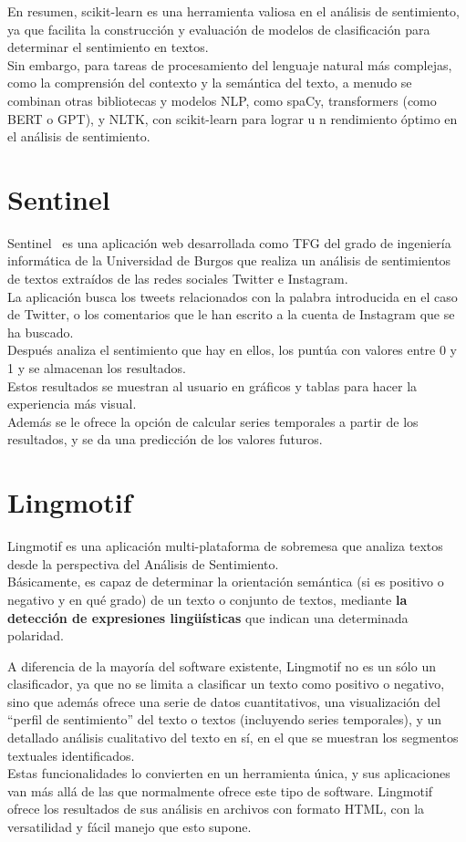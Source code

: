En resumen, scikit-learn es una herramienta valiosa en el análisis de sentimiento, 
ya que facilita la construcción y evaluación de modelos de clasificación 
para determinar el sentimiento en textos.\\ 
Sin embargo, para tareas de procesamiento del lenguaje natural 
más complejas, como la comprensión del contexto y la semántica del texto, 
a menudo se combinan otras bibliotecas y modelos NLP, como spaCy, 
transformers (como BERT o GPT), y NLTK, con scikit-learn para lograr u
n rendimiento óptimo en el análisis de sentimiento.


\section{Sentinel}
Sentinel~\cite{Sentinel1} es una aplicación web desarrollada como TFG del grado de ingeniería 
informática de la Universidad de Burgos que realiza un análisis de sentimientos de textos 
extraídos de las redes sociales Twitter e Instagram.\\
La aplicación busca los tweets relacionados con la palabra introducida 
en el caso de Twitter, o los comentarios que le han escrito a la 
cuenta de Instagram que se ha buscado.\\
Después analiza el sentimiento que hay en ellos, los puntúa con valores entre 0 y 1 y 
se almacenan los resultados.\\
Estos resultados se muestran al usuario en gráficos 
y tablas para hacer la experiencia más visual.\\ 
Además se le ofrece la opción de calcular series temporales a partir de los resultados, 
y se da una predicción de los valores futuros.


\section{Lingmotif~\cite{lingmotif}}
Lingmotif es una aplicación multi-plataforma de sobremesa que analiza textos desde la perspectiva 
del Análisis de Sentimiento. \\Básicamente, es capaz de determinar la orientación semántica 
(si es positivo o negativo y en qué grado) de un texto o conjunto de textos, mediante \textbf{la detección 
de expresiones lingüísticas} que indican una determinada polaridad.

A diferencia de la mayoría del software existente, Lingmotif no es un sólo un clasificador, 
ya que no se limita a clasificar un texto como positivo o negativo, sino que además ofrece una
 serie de datos cuantitativos, una visualización del ``perfil de sentimiento'' del texto o textos 
 (incluyendo series temporales), y un detallado análisis cualitativo del texto en sí, en el que 
 se muestran los segmentos textuales identificados. \\Estas funcionalidades lo convierten en un herramienta 
 única, y sus aplicaciones van más allá de las que normalmente ofrece este tipo de software. 
 Lingmotif ofrece los resultados de sus análisis en archivos con formato HTML, con la versatilidad y 
 fácil manejo que esto supone.

